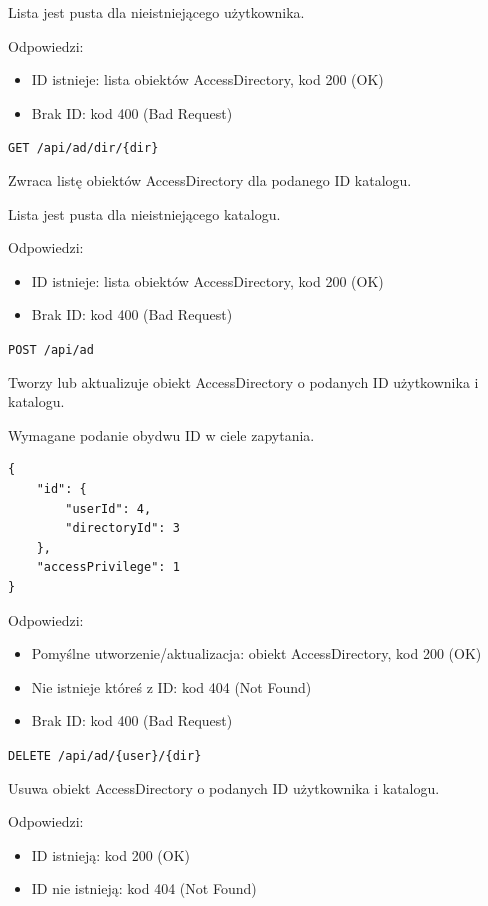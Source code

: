 \documentclass[a4paper,twoside,12pt]{book}
\begin{document}
Lista jest pusta dla nieistniejącego użytkownika.

Odpowiedzi: 
\begin{itemize}
	\item ID istnieje: lista obiektów AccessDirectory, kod 200 (OK)
	\item Brak ID: kod 400 (Bad Request)
\end{itemize}

\label{get-accessdirectory-by-directory}

\texttt{GET\ /api/ad/dir/\{dir\}}

Zwraca listę obiektów AccessDirectory dla podanego ID katalogu.

Lista jest pusta dla nieistniejącego katalogu.

Odpowiedzi: 
\begin{itemize}
	\item ID istnieje: lista obiektów AccessDirectory, kod 200 (OK)
	\item Brak ID: kod 400 (Bad Request)
\end{itemize}

\label{modify-accessdirectory}

\texttt{POST\ /api/ad}

Tworzy lub aktualizuje obiekt AccessDirectory o podanych ID użytkownika i katalogu.

Wymagane podanie obydwu ID w ciele zapytania.

\begin{verbatim}
{
    "id": {
        "userId": 4,
        "directoryId": 3
    },
    "accessPrivilege": 1
}
\end{verbatim}

Odpowiedzi: 
\begin{itemize}
	\item Pomyślne utworzenie/aktualizacja: obiekt AccessDirectory, kod 200 (OK) 
	\item Nie istnieje któreś z ID: kod 404 (Not Found) 
	\item Brak ID: kod 400 (Bad Request)
\end{itemize}

\label{delete-accessdirectory}

\texttt{DELETE\ /api/ad/\{user\}/\{dir\}}

Usuwa obiekt AccessDirectory o podanych ID użytkownika i katalogu.

Odpowiedzi: 
\begin{itemize}
	\item ID istnieją: kod 200 (OK) 
	\item ID nie istnieją: kod 404 (Not Found)
\end{itemize}
\end{document}
